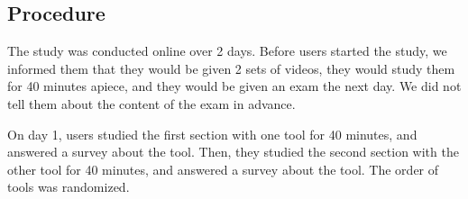 \documentclass{sigchi}
\begin{document}
\subsection{Procedure}

The study was conducted online over 2 days. Before users started the study, we informed them that they would be given 2 sets of videos, they would study them for 40 minutes apiece, and they would be given an exam the next day. We did not tell them about the content of the exam in advance. %



On day 1, users studied the first section with one tool for 40 minutes, and answered a survey about the tool. Then, they studied the second section with the other tool for 40 minutes, and answered a survey about the tool. The order of tools was randomized. %



\end{document}
